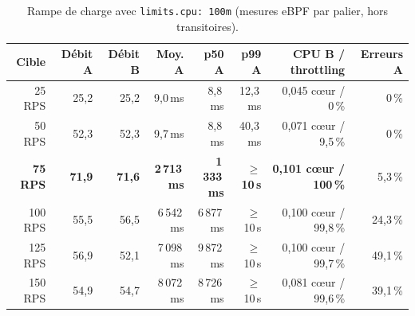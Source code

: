 \documentclass[10pt,a4paper]{article}
\newcommand{\code}[1]{\texttt{\small #1}}
\begin{document}
\begin{table}[H]\centering\small
{}
\begin{tabular}{@{}rrrrrrrr@{}}
\toprule
\textbf{Cible} & \textbf{Débit A} & \textbf{Débit B} & \textbf{Moy. A} & \textbf{p50 A} & \textbf{p99 A} & \textbf{CPU B / throttling} & \textbf{Erreurs A} \\ \midrule
 25 RPS & 25,2 & 25,2 &     9,0\,ms &     8,8\,ms &   12,3\,ms & 0,045 cœur / 0\,\%     & 0\,\% \\
 50 RPS & 52,3 & 52,3 &     9,7\,ms &     8,8\,ms &   40,3\,ms & 0,071 cœur / 9,5\,\%   & 0\,\% \\
 \textbf{75 RPS} & \textbf{71,9} & \textbf{71,6} & \textbf{2\,713\,ms} & \textbf{1\,333\,ms} & \textbf{$\geq$10\,s} & \textbf{0,101 cœur / 100\,\%} & 5,3\,\% \\
100 RPS & 55,5 & 56,5 & 6\,542\,ms & 6\,877\,ms & $\geq$10\,s & 0,100 cœur / 99,8\,\% & 24,3\,\% \\
125 RPS & 56,9 & 52,1 & 7\,098\,ms & 9\,872\,ms & $\geq$10\,s & 0,100 cœur / 99,7\,\% & 49,1\,\% \\
150 RPS & 54,9 & 54,7 & 8\,072\,ms & 8\,726\,ms & $\geq$10\,s & 0,081 cœur / 99,6\,\% & 39,1\,\% \\
\bottomrule
\end{tabular}
\caption{Rampe de charge avec \code{limits.cpu: 100m} (mesures eBPF par palier, hors transitoires).}
\end{table}
\end{document}

